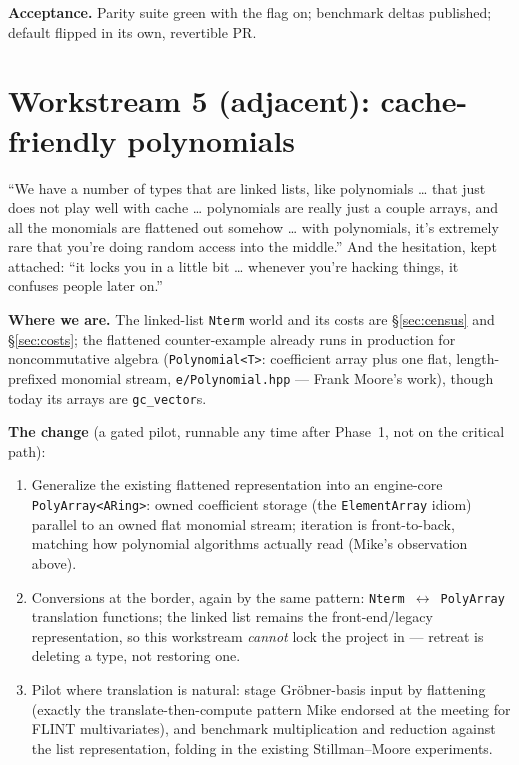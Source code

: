 \documentclass[11pt,oneside]{report}
\newcommand{\code}[1]{\textcolor{m2code}{\texttt{#1}}}
\newcommand{\file}[1]{\textcolor{m2file}{\texttt{#1}}}
\begin{document}
\textbf{Acceptance.} Parity suite green with the flag on; benchmark deltas
published; default flipped in its own, revertible PR.

\section{Workstream 5 (adjacent): cache-friendly polynomials}
\label{sec:ws-poly}

\begin{mikesays}[on representations]
``We have a number of types that are linked lists, like polynomials \ldots{}
that just does not play well with cache \ldots{} polynomials are really
just a couple arrays, and all the monomials are flattened out somehow
\ldots{} with polynomials, it's extremely rare that you're doing random
access into the middle.'' And the hesitation, kept attached: ``it locks
you in a little bit \ldots{} whenever you're hacking things, it confuses
people later on.''
\end{mikesays}

\textbf{Where we are.} The linked-list \code{Nterm} world and its costs
are \S\ref{sec:census} and \S\ref{sec:costs}; the flattened
counter-example already runs in production for noncommutative algebra
(\code{Polynomial<T>}: coefficient array plus one flat, length-prefixed
monomial stream, \file{e/Polynomial.hpp} --- Frank Moore's work), though
today its arrays are \code{gc\_vector}s.

\textbf{The change} (a gated pilot, runnable any time after Phase~1, not
on the critical path):

\begin{enumerate}
\item Generalize the existing flattened representation into an engine-core
  \code{PolyArray<ARing>}: owned coefficient storage (the
  \code{ElementArray} idiom) parallel to an owned flat monomial stream;
  iteration is front-to-back, matching how polynomial algorithms actually
  read (Mike's observation above).
\item Conversions at the border, again by the same pattern:
  \code{Nterm}~$\leftrightarrow$~\code{PolyArray} translation functions;
  the linked list remains the front-end/legacy representation, so this
  workstream \emph{cannot} lock the project in --- retreat is deleting a
  type, not restoring one.
\item Pilot where translation is natural: stage Gr\"obner-basis input by
  flattening (exactly the translate-then-compute pattern Mike endorsed at
  the meeting for FLINT multivariates), and benchmark multiplication and
  reduction against the list representation, folding in the existing
  Stillman--Moore experiments.
\end{enumerate}
\end{document}
